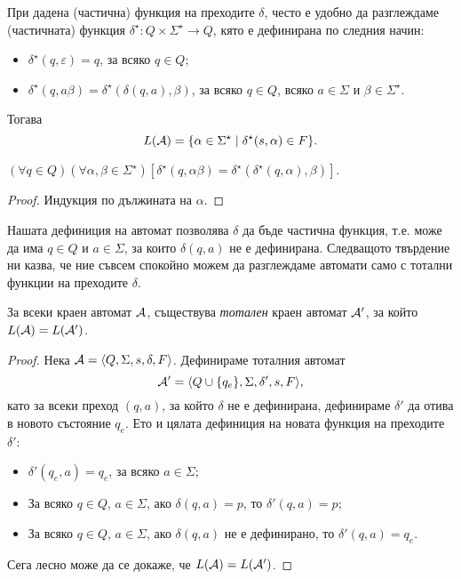 При дадена (частична) функция на преходите $\delta$,
често е удобно да разглеждаме (частичната) функция $\delta^\star:Q\times\Sigma^\star \to Q$, кято е дефинирана по следния начин:
\begin{itemize}
\item 
  $\delta^\star(q,\varepsilon) = q$, за всяко $q\in Q$;
\item
  $\delta^\star(q,a\beta) = \delta^\star(\delta(q,a),\beta)$, за всяко $q\in Q$, всяко $a\in\Sigma$ и $\beta\in\Sigma^\star$.
\end{itemize}
Тогава \[L(\mathcal{A}) = \{\alpha\in\Sigma^\star \mid \delta^\star(s,\alpha) \in F\}.\]

\begin{prop}
  $(\forall q\in Q)(\forall\alpha,\beta\in\Sigma^\star)[\delta^\star(q,\alpha\beta) = \delta^\star(\delta^\star(q,\alpha),\beta)]$.
\end{prop}
\begin{proof}
  Индукция по дължината на $\alpha$.
\end{proof}

Нашата дефиниция на автомат позволява $\delta$ да бъде частична функция, т.е.
може да има $q\in Q$ и $a\in\Sigma$, за които $\delta(q,a)$ не е дефинирана.
Следващото твърдение ни казва, че ние съвсем спокойно можем да разглеждаме автомати
само с тотални функции на преходите  $\delta$.
\begin{prop}
  За всеки краен автомат $\mathcal{A}$, съществува {\em тотален} краен автомат $\mathcal{A}'$,
  за който $L(\mathcal{A}) = L(\mathcal{A}')$.
\end{prop}
\begin{proof}
  Нека $\mathcal{A} = \langle{Q,\Sigma,s,\delta,F}\rangle$.
  Дефинираме тоталния автомат 
  \[\mathcal{A}' = \langle{Q\cup\{q_e\}, \Sigma, \delta', s, F}\rangle,\]
  като за всеки преход $(q,a)$, за който $\delta$ не е дефинирана, 
  дефинираме $\delta'$ да отива в новото състояние $q_e$.
  Ето и цялата дефиниция на новата функция на преходите $\delta'$:
  \begin{itemize}
  \item 
    $\delta'(q_e,a) = q_e$, за всяко $a\in\Sigma$;
  \item
    За всяко $q\in Q$, $a\in\Sigma$, ако $\delta(q,a) = p$, то
    $\delta'(q,a) = p$;
  \item
    За всяко $q\in Q$, $a\in\Sigma$, ако $\delta(q,a)$ не е дефинирано, то
    $\delta'(q,a) = q_e$.
  \end{itemize}
  Сега лесно може да се докаже, че $L(\mathcal{A}) = L(\mathcal{A}')$.
\end{proof}

